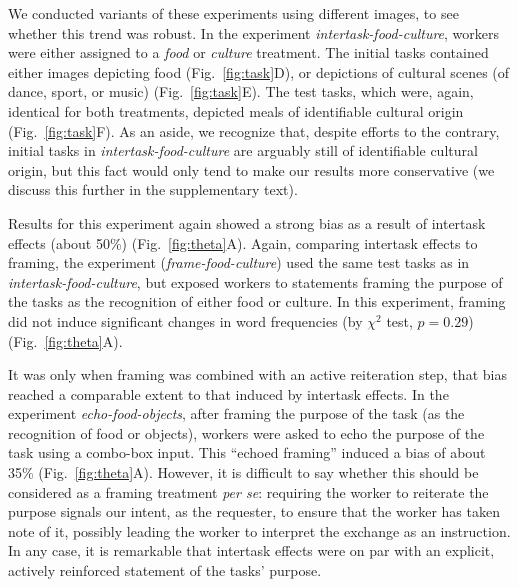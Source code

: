 \documentclass{pnastwo}
\begin{document}
\begin{article}
We conducted variants of these experiments using different images, to see
whether this trend was robust.  In the experiment
\textit{intertask-food-culture}, workers were either assigned to a
\textit{food} or \textit{culture} treatment.  The initial tasks contained
either images depicting food (Fig.~\ref{fig:task}D), or depictions of cultural
scenes (of dance, sport, or music) (Fig.~\ref{fig:task}E).  The test tasks,
which were, again, identical for both treatments, depicted meals of
identifiable cultural origin (Fig.~\ref{fig:task}F).  As an aside, we recognize
that, despite efforts to the contrary, initial tasks in
\textit{intertask-food-culture} are arguably still of identifiable cultural
origin, but this fact would only tend to make our results more conservative (we
discuss this further in the supplementary text). 

Results for this experiment again showed a strong bias as a result of intertask
effects (about 50\%) (Fig.~\ref{fig:theta}A).  Again, comparing intertask
effects to framing, the experiment (\textit{frame-food-culture}) used the same
test tasks as in \textit{intertask-food-culture}, but exposed workers to
statements framing the purpose of the tasks as the recognition of either food
or culture.  In this experiment, framing did not induce significant changes in
word frequencies (by $\chi^2$ test, $p=0.29$) (Fig.~\ref{fig:theta}A).

It was only when framing was combined with an active reiteration step, that
bias reached a comparable extent to that induced by intertask effects.  In the
experiment \textit{echo-food-objects}, after framing the purpose of the task
(as the recognition of food or objects), workers were asked to echo the purpose
of the task using a combo-box input.  This  ``echoed framing'' induced a bias
of about 35\% (Fig.~\ref{fig:theta}A). However, it is difficult to say whether
this should be considered as a framing treatment \textit{per se}: requiring the
worker to reiterate the purpose signals our intent, as the requester, to ensure
that the worker has taken note of it, possibly leading the worker to interpret
the exchange as an instruction.  In any case, it is remarkable that intertask
effects were on par with an explicit, actively reinforced statement of the
tasks' purpose.


\end{article}
\end{document}
